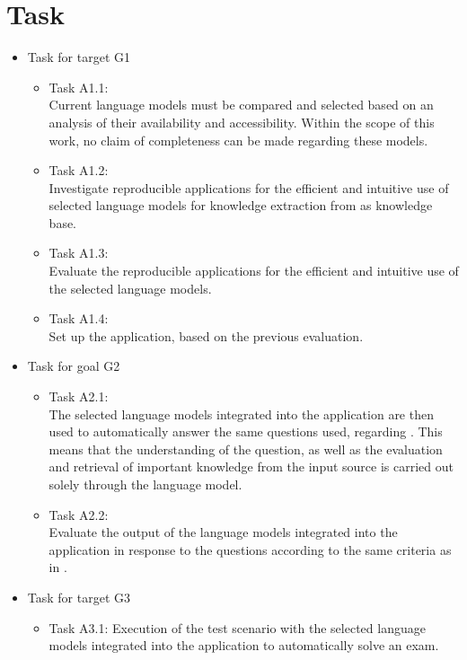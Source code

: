 \section{Task}
\begin{itemize}
  \item Task for target G1
        \begin{itemize}
          \item Task A1.1:\\
          Current language models must be compared and selected based on an analysis of their availability and accessibility. 
          Within the scope of this work, no claim of completeness can be made regarding these models.
          \item Task A1.2:\\Investigate reproducible applications for the efficient and intuitive use of selected language models for knowledge extraction from \citet{bb2} as knowledge base.
          \item Task A1.3:\\Evaluate the reproducible applications for the efficient and intuitive use of the selected language models. 
          \item Task A1.4:\\Set up the application, based on the previous evaluation. 
        \end{itemize}
  \item Task for goal G2
        \begin{itemize}
        \item Task A2.1:\\
        The selected language models integrated into the application are then used to automatically answer the same questions \citet{Paul_Keller} used, regarding \citet{bb2}. 
        This means that the understanding of the question, as well as the evaluation and retrieval of important knowledge from the input source \citet{bb2} is carried out solely through the language model.
        \item Task A2.2:\\
        Evaluate the output of the language models integrated into the application in response to the questions according to the same criteria as in \citet{Paul_Keller}.
        \end{itemize}
 \item Task for target G3
    \begin{itemize}
          \item Task A3.1: Execution of the test scenario with the selected language models integrated into the application to automatically solve an exam. 

\end{itemize}
\end{itemize}
